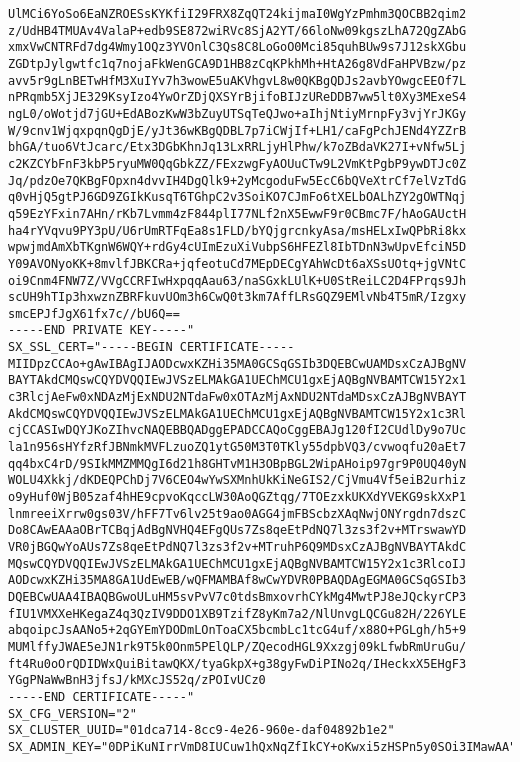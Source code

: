 \begin{lstlisting}
UlMCi6YoSo6EaNZROESsKYKfiI29FRX8ZqQT24kijmaI0WgYzPmhm3QOCBB2qim2
z/UdHB4TMUAv4ValaP+edb9SE872wiRVc8SjA2YT/66loNw09kgszLhA72QgZAbG
xmxVwCNTRFd7dg4Wmy1OQz3YVOnlC3Qs8C8LoGoO0Mci85quhBUw9s7J12skXGbu
ZGDtpJylgwtfc1q7nojaFkWenGCA9D1HB8zCqKPkhMh+HtA26g8VdFaHPVBzw/pz
avv5r9gLnBETwHfM3XuIYv7h3wowE5uAKVhgvL8w0QKBgQDJs2avbYOwgcEEOf7L
nPRqmb5XjJE329KsyIzo4YwOrZDjQXSYrBjifoBIJzUReDDB7ww5lt0Xy3MExeS4
ngL0/oWotjd7jGU+EdABozKwW3bZuyUTSqTeQJwo+aIhjNtiyMrnpFy3vjYrJKGy
W/9cnv1WjqxpqnQgDjE/yJt36wKBgQDBL7p7iCWjIf+LH1/caFgPchJENd4YZZrB
bhGA/tuo6VtJcarc/Etx3DGbKhnJq13LxRRLjyHlPhw/k7oZBdaVK27I+vNfw5Lj
c2KZCYbFnF3kbP5ryuMW0QqGbkZZ/FExzwgFyAOUuCTw9L2VmKtPgbP9ywDTJc0Z
Jq/pdzOe7QKBgFOpxn4dvvIH4DgQlk9+2yMcgoduFw5EcC6bQVeXtrCf7elVzTdG
q0vHjQ5gtPJ6GD9ZGIkKusqT6TGhpC2v3SoiKO7CJmFo6tXELbOALhZY2gOWTNqj
q59EzYFxin7AHn/rKb7Lvmm4zF844plI77NLf2nX5EwwF9r0CBmc7F/hAoGAUctH
ha4rYVqvu9PY3pU/U6rUmRTFqEa8s1FLD/bYQjgrcnkyAsa/msHELxIwQPbRi8kx
wpwjmdAmXbTKgnW6WQY+rdGy4cUImEzuXiVubpS6HFEZl8IbTDnN3wUpvEfciN5D
Y09AVONyoKK+8mvlfJBKCRa+jqfeotuCd7MEpDECgYAhWcDt6aXSsUOtq+jgVNtC
oi9Cnm4FNW7Z/VVgCCRFIwHxpqqAau63/naSGxkLUlK+U0StReiLC2D4FPrqs9Jh
scUH9hTIp3hxwznZBRFkuvUOm3h6CwQ0t3km7AffLRsGQZ9EMlvNb4T5mR/Izgxy
smcEPJfJgX61fx7c//bU6Q==
-----END PRIVATE KEY-----"
SX_SSL_CERT="-----BEGIN CERTIFICATE-----
MIIDpzCCAo+gAwIBAgIJAODcwxKZHi35MA0GCSqGSIb3DQEBCwUAMDsxCzAJBgNV
BAYTAkdCMQswCQYDVQQIEwJVSzELMAkGA1UEChMCU1gxEjAQBgNVBAMTCW15Y2x1
c3RlcjAeFw0xNDAzMjExNDU2NTdaFw0xOTAzMjAxNDU2NTdaMDsxCzAJBgNVBAYT
AkdCMQswCQYDVQQIEwJVSzELMAkGA1UEChMCU1gxEjAQBgNVBAMTCW15Y2x1c3Rl
cjCCASIwDQYJKoZIhvcNAQEBBQADggEPADCCAQoCggEBAJg120fI2CUdlDy9o7Uc
la1n956sHYfzRfJBNmkMVFLzuoZQ1ytG50M3T0TKly55dpbVQ3/cvwoqfu20aEt7
qq4bxC4rD/9SIkMMZMMQgI6d21h8GHTvM1H3OBpBGL2WipAHoip97gr9P0UQ40yN
WOLU4Xkkj/dKDEQPChDj7V6CEO4wYwSXMnhUkKiNeGIS2/CjVmu4Vf5eiB2urhiz
o9yHuf0WjB05zaf4hHE9cpvoKqccLW30AoQGZtqg/7TOEzxkUKXdYVEKG9skXxP1
lnmreeiXrrw0gs03V/hFF7Tv6lv25t9ao0AGG4jmFBScbzXAqNwjONYrgdn7dszC
Do8CAwEAAaOBrTCBqjAdBgNVHQ4EFgQUs7Zs8qeEtPdNQ7l3zs3f2v+MTrswawYD
VR0jBGQwYoAUs7Zs8qeEtPdNQ7l3zs3f2v+MTruhP6Q9MDsxCzAJBgNVBAYTAkdC
MQswCQYDVQQIEwJVSzELMAkGA1UEChMCU1gxEjAQBgNVBAMTCW15Y2x1c3RlcoIJ
AODcwxKZHi35MA8GA1UdEwEB/wQFMAMBAf8wCwYDVR0PBAQDAgEGMA0GCSqGSIb3
DQEBCwUAA4IBAQBGwoULuHM5svPvV7c0tdsBmxovrhCYkMg4MwtPJ8eJQckyrCP3
fIU1VMXXeHKegaZ4q3QzIV9DDO1XB9TzifZ8yKm7a2/NlUnvgLQCGu82H/226YLE
abqoipcJsAANo5+2qGYEmYDODmLOnToaCX5bcmbLc1tcG4uf/x88O+PGLgh/h5+9
MUMlffyJWAE5eJN1rk9T5k0Onm5PElQLP/ZQecodHGL9Xxzgj09kLfwbRmUruGu/
ft4Ru0oOrQDIDWxQuiBitawQKX/tyaGkpX+g38gyFwDiPINo2q/IHeckxX5EHgF3
YGgPNaWwBnH3jfsJ/kMXcJS52q/zPOIvUCz0
-----END CERTIFICATE-----"
SX_CFG_VERSION="2"
SX_CLUSTER_UUID="01dca714-8cc9-4e26-960e-daf04892b1e2"
SX_ADMIN_KEY="0DPiKuNIrrVmD8IUCuw1hQxNqZfIkCY+oKwxi5zHSPn5y0SOi3IMawAA"
\end{lstlisting}
